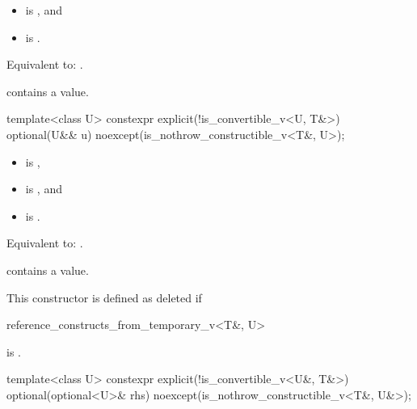 \begin{itemdescr}
\pnum
\constraints
\begin{itemize}
\item {} is , and
\item {} is .
\end{itemize}

\pnum
\effects
Equivalent to: .

\pnum
\ensures
{} contains a value.
\end{itemdescr}

%
\begin{itemdecl}
template<class U>
  constexpr explicit(!is_convertible_v<U, T&>) optional(U&& u) noexcept(is_nothrow_constructible_v<T&, U>);
\end{itemdecl}

\begin{itemdescr}
\pnum
\constraints
\begin{itemize}
\item {} is ,
\item {} is , and
\item {} is .
\end{itemize}

\pnum
\effects
Equivalent to: .

\pnum
\ensures
{} contains a value.

\pnum
\remarks
This constructor is defined as deleted if
\begin{codeblock}
reference_constructs_from_temporary_v<T&, U>
\end{codeblock}
is .
\end{itemdescr}

%
\begin{itemdecl}
template<class U>
  constexpr explicit(!is_convertible_v<U&, T&>) optional(optional<U>& rhs) noexcept(is_nothrow_constructible_v<T&, U&>);
\end{itemdecl}

